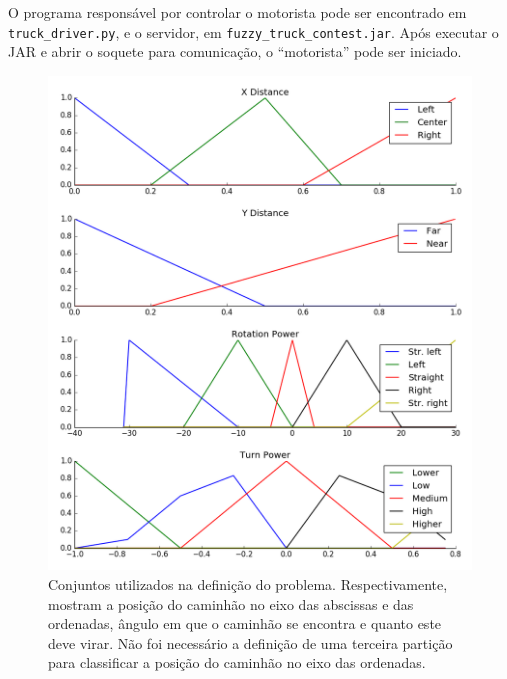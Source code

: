 \documentclass{article}
\begin{document}
O programa responsável por controlar o motorista pode ser encontrado em
\texttt{truck\_driver.py}, e o servidor, em \texttt{fuzzy\_truck\_contest.jar}.
Após executar o JAR e abrir o soquete para comunicação, o ``motorista'' pode
ser iniciado.

\begin{figure}[ht]
    \centering
    \includegraphics[scale=0.5]{figure_1.png}
    \caption{Conjuntos utilizados na definição do problema. Respectivamente,
        mostram a posição do caminhão no eixo das abscissas e das ordenadas,
        ângulo em que o caminhão se encontra e quanto este deve virar. Não
        foi necessário a definição de uma terceira partição para classificar
        a posição do caminhão no eixo das ordenadas.}
    \label{fig01}
\end{figure}
\end{document}

